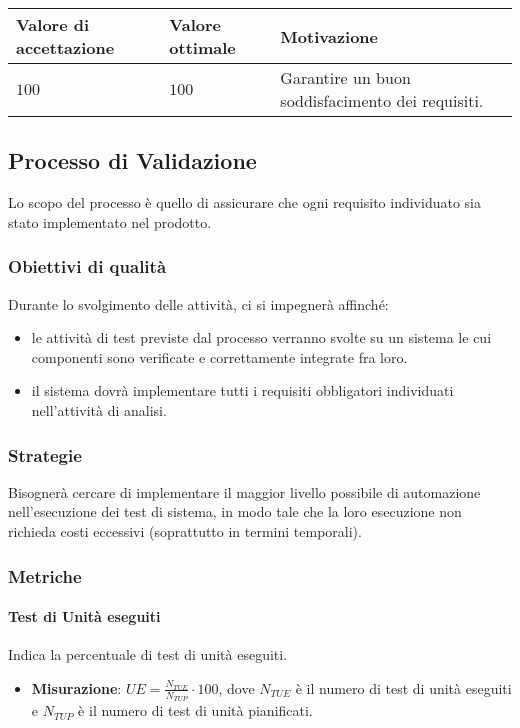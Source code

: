 \begin{center}
		\begin{tabular}{|P{2.5cm}|P{2.5cm}|P{6cm}|}
		\hline
			\textbf{Valore di accettazione}	& \textbf{Valore ottimale} & \textbf{Motivazione} \\
			\hline
			$100$ & $100$ &	Garantire un buon soddisfacimento dei requisiti. \\
			\hline
			\end{tabular}
\end{center}

\subsection{Processo di Validazione}
Lo scopo del processo è quello di assicurare che ogni requisito individuato sia stato implementato nel prodotto.

\subsubsection{Obiettivi di qualità}
Durante lo svolgimento delle attività, ci si impegnerà affinché:
\begin{itemize}
\item le attività di test previste dal processo verranno svolte su un sistema le cui componenti sono verificate e correttamente integrate fra loro.
\item il sistema dovrà implementare tutti i requisiti obbligatori individuati nell'attività di analisi.
\end{itemize}

\subsubsection{Strategie}
Bisognerà cercare di implementare il maggior livello possibile di automazione nell'esecuzione dei test di sistema, in modo tale che la loro esecuzione non richieda costi eccessivi (soprattutto in termini temporali).

\subsubsection{Metriche}

\paragraph{Test di Unità eseguiti}
Indica la percentuale di test di unità eseguiti.
\begin{itemize}
\item \textbf{Misurazione}: $UE=\frac{N_{TUE}}{N_{TUP}} \cdot 100$, dove $N_{TUE}$ è il numero di test di unità eseguiti e $N_{TUP}$ è il numero di test di unità pianificati.
\end{itemize}

